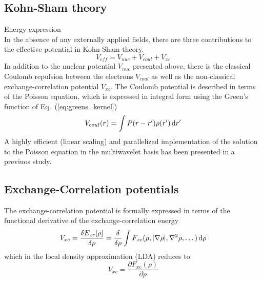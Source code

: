 \subsection{Kohn-Sham theory}
Energy expression\\

In the absence of any externally applied fields, there are three contributions 
to the effective potential in Kohn-Sham theory.
\begin{equation}
    \label{eq:eff_pot}
    V_{eff} = V_{nuc} + V_{coul} + V_{xc}
\end{equation}
In addition to the nuclear potential $V_{nuc}$ presented above, there is the 
classical Coulomb repulsion between the electrons $V_{coul}$ as well as the 
non-classical exchange-correlation potential $V_{xc}$. The Coulomb potential 
is described in terms of the Poisson equation, which is expressed in integral 
form using the Green's function of Eq.~(\ref{eq:greens_kernel})
\begin{equation}
    \label{eq:coulomb}
    V_{coul}(r) = \int P(r-r')\rho(r')\,\mathrm{d} r'
\end{equation}
A highly efficient (linear scaling) and parallelized implementation of the 
solution to the Poisson equation in the multiwavelet basis has been presented 
in a previuos study\cite{mwpar}. 

\subsection{Exchange-Correlation potentials}
The exchange-correlation potential is formally expressed in terms of the 
functional derivative of the exchange-correlation energy
\begin{equation}
    V_{xc} 	= \frac{\delta E_{xc}[\rho]}{\delta \rho} 
		= \frac{\delta}{\delta \rho} \int F_{xc}(\rho,|\nabla\rho|,\nabla^2\rho,\dots) \,\mathrm{d} \rho
\end{equation}
which in the local density approximation (LDA) reduces to
\begin{equation}
    V_{xc} = \frac{\partial F_{xc}(\rho)}{\partial \rho}
\end{equation}

